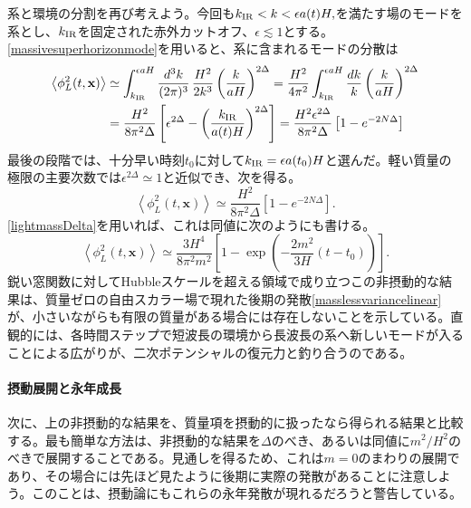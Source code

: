\documentclass[a4paper,11pt,oneside]{article}
\theoremstyle{definition}
\numberwithin{equation}{section}
\begin{document}
系と環境の分割を再び考えよう。今回も\(
k_{\rm IR}
<
k
<
\epsilon a(t)H,
\)を満たす場のモードを系とし、\(k_{\rm IR}\)を固定された赤外カットオフ、\(\epsilon\lesssim1\)とする。\eqref{massivesuperhorizonmode}を用いると、系に含まれるモードの分散は
\begin{align}
\left\langle
\phi_{L}^{2}(t,\mathbf{x})
\right\rangle
&\simeq
\int_{k_{\rm IR}}^{\epsilon aH}
\frac{d^{3}k}{(2\pi)^{3}}\,
\frac{H^{2}}{2k^{3}}
\left(
\frac{k}{aH}
\right)^{2\Delta}=
\frac{H^{2}}{4\pi^{2}}
\int_{k_{\rm IR}}^{\epsilon aH}
\frac{dk}{k}
\left(
\frac{k}{aH}
\right)^{2\Delta}\\
&=
\frac{H^{2}}{8\pi^{2}\Delta}
\left[
\epsilon^{2\Delta}
-
\left(
\frac{k_{\rm IR}}{a(t)H}
\right)^{2\Delta}
\right]=\frac{H^{2}\epsilon^{2\Delta}}{8\pi^{2}\Delta}
\left[
1
-
e^{-2 N\Delta}
\right]
\label{massivevariancecutoff}
\end{align}
最後の段階では、十分早い時刻$ t_{0}$に対して\( k_{\rm IR}
=
\epsilon a(t_{0})H \)と選んだ。軽い質量の極限の主要次数では\(\epsilon^{2\Delta}\simeq 1\)と近似でき、次を得る。
\begin{equation}
\left\langle
\phi_{L}^{2}(t,\mathbf{x})
\right\rangle
\simeq
\frac{H^{2}}{8\pi^{2}\Delta}
\left[
1
-
e^{-2N\Delta }
\right].
\label{exactmassivevariance}
\end{equation}
\eqref{lightmassDelta}を用いれば、これは同値に次のようにも書ける。
\begin{equation}
\left\langle
\phi_{L}^{2}(t,\mathbf{x})
\right\rangle
\simeq
\frac{3H^{4}}{8\pi^{2}m^{2}}
\left[
1
-
\exp\left(
-\frac{2m^{2}}{3H}(t-t_{0})
\right)
\right].
\label{exactlightmassivevariance}
\end{equation}
鋭い窓関数に対してHubbleスケールを超える領域で成り立つこの非摂動的な結果は、質量ゼロの自由スカラー場で現れた後期の発散\eqref{masslessvariancelinear}が、小さいながらも有限の質量がある場合には存在しないことを示している。直観的には、各時間ステップで短波長の環境から長波長の系へ新しいモードが入ることによる広がりが、二次ポテンシャルの復元力と釣り合うのである。





\paragraph{摂動展開と永年成長} 次に、上の非摂動的な結果を、質量項を摂動的に扱ったなら得られる結果と比較する。最も簡単な方法は、非摂動的な結果を\(\Delta\)のべき、あるいは同値に\(m^{2}/H^{2}\)のべきで展開することである。見通しを得るため、これは$m = 0 $のまわりの展開であり、その場合には先ほど見たように後期に実際の発散があることに注意しよう。このことは、摂動論にもこれらの永年発散が現れるだろうと警告している。
\end{document}
